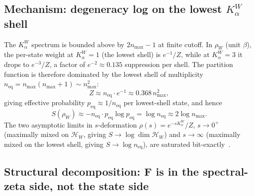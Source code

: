 \documentclass[11pt,a4paper]{article}
\theoremstyle{plain}
\theoremstyle{definition}
\newcommand{\nmax}{n_{\max}}
\newcommand{\Hilb}{\mathcal{H}}
\newcommand{\Kalpha}{K_{\alpha}^{W}}
\newcommand{\rhoW}{\rho_{W}}
\begin{document}
\subsection{Mechanism: degeneracy log on the lowest $\Kalpha$ shell}

The $\Kalpha$ spectrum is bounded above by $2\nmax - 1$ at finite
cutoff. In $\rhoW$ (unit $\beta$), the per-state weight at
$\Kalpha = 1$ (the lowest shell) is $e^{-1}/Z$, while at $\Kalpha = 3$
it drops to $e^{-3}/Z$, a factor of $e^{-2} \approx 0.135$ suppression
per shell. The partition function is therefore dominated by the
lowest shell of multiplicity $n_{\mathrm{eq}} = \nmax(\nmax + 1)
\sim \nmax^{2}$:
\[
Z \approx n_{\mathrm{eq}} \cdot e^{-1} \approx 0.368\, \nmax^{2},
\]
giving effective probability $p_{\mathrm{eq}} \approx 1/n_{\mathrm{eq}}$
per lowest-shell state, and hence
\[
S(\rhoW) \approx -n_{\mathrm{eq}} \cdot p_{\mathrm{eq}} \log p_{\mathrm{eq}}
= \log n_{\mathrm{eq}} \approx 2 \log \nmax.
\]
The two asymptotic limits in $s$-deformation $\rho(s) = e^{-s
\Kalpha}/Z$, $s \to 0^{+}$ (maximally mixed on $\Hilb_{W}$, giving
$S \to \log \dim \Hilb_{W}$) and $s \to \infty$ (maximally mixed on
the lowest shell, giving $S \to \log n_{\mathrm{eq}}$), are
saturated bit-exactly~\cite{debug:bh_phase0}.

\subsection{Structural decomposition: F is in the spectral-zeta side, not the state side}
\end{document}
